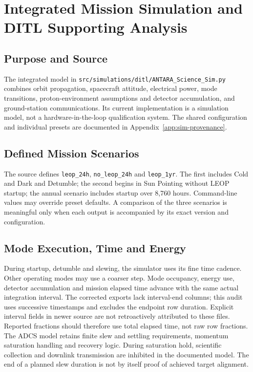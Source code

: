 
\section{Integrated Mission Simulation and DITL Supporting Analysis}\label{app:ditl-detail}
\subsection{Purpose and Source}\label{app:ditl-source}
The integrated model in \texttt{src/simulations/ditl/ANTARA\_Science\_Sim.py} combines orbit propagation, spacecraft attitude, electrical power, mode transitions, proton-environment assumptions and detector accumulation, and ground-station communications. Its current implementation is a simulation model, not a hardware-in-the-loop qualification system. The shared configuration and individual presets are documented in Appendix~\ref{app:sim-provenance}.
\subsection{Defined Mission Scenarios}\label{app:ditl-preset-details}
The source defines \texttt{leop\_24h}, \texttt{no\_leop\_24h} and \texttt{leop\_1yr}. The first includes Cold and Dark and Detumble; the second begins in Sun Pointing without LEOP startup; the annual scenario includes startup over 8,760 hours. Command-line values may override preset defaults. A comparison of the three scenarios is meaningful only when each output is accompanied by its exact version and configuration.
\subsection{Mode Execution, Time and Energy}\label{app:ditl-accounting}
During startup, detumble and slewing, the simulator uses its fine time cadence. Other operating modes may use a coarser step. Mode occupancy, energy use, detector accumulation and mission elapsed time advance with the same actual integration interval. The corrected exports lack interval-end columns; this audit uses successive timestamps and excludes the endpoint row duration. Explicit interval fields in newer source are not retroactively attributed to these files. Reported fractions should therefore use total elapsed time, not raw row fractions.
The ADCS model retains finite slew and settling requirements, momentum saturation handling and recovery logic. During saturation hold, scientific collection and downlink transmission are inhibited in the documented model. The end of a planned slew duration is not by itself proof of achieved target alignment.
